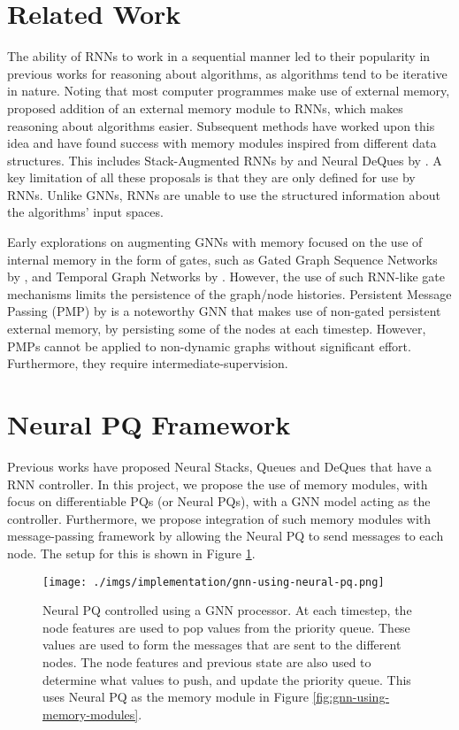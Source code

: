 \documentclass{article}
\theoremstyle{plain}
\theoremstyle{definition}
\theoremstyle{remark}
\begin{document}
\section{Related Work}
The ability of RNNs to work in a sequential manner led to their popularity in previous works for reasoning about algorithms, as algorithms tend to be iterative in nature.
Noting that most computer programmes make use of external memory, \citet{Graves-NTM} proposed addition of an external memory module to RNNs, which makes reasoning about
algorithms easier. Subsequent methods have worked upon this idea and have found success with memory modules inspired from different data structures.
This includes Stack-Augmented RNNs by \citep{Joulin-Stack-RNN} and Neural DeQues by \citet{Grefenstette-neural-queue}. A key limitation of all these proposals is that they
are only defined for use by RNNs. Unlike GNNs, RNNs are unable to use the structured information about the algorithms' input spaces.

Early explorations on augmenting GNNs with memory focused on the use of internal memory in the form of gates, such as Gated Graph Sequence Networks
by \citet{Li-GGSN}, and Temporal Graph Networks by \citet{Rossi-TGN}. However, the use of such RNN-like gate mechanisms limits the persistence of the graph/node histories.
Persistent Message Passing (PMP) by \citet{Strathmann-PMP} is a noteworthy GNN that makes use of non-gated persistent external memory, by persisting some of the nodes at each
timestep. However, PMPs cannot be applied to non-dynamic graphs without significant effort. Furthermore, they require intermediate-supervision.

\section{Neural PQ Framework}
Previous works have proposed Neural Stacks, Queues and DeQues \citep{Grefenstette-neural-queue,Joulin-Stack-RNN} that
have a RNN controller. In this project, we propose the use of memory modules, with focus on differentiable PQs (or Neural PQs),
with a GNN model acting as the controller. Furthermore, we propose integration of such memory modules with message-passing
framework by allowing the Neural PQ to send messages to each node. The setup for this is shown in Figure \ref{fig:gnn-using-neural-pq}.

\begin{figure}[tbh]
    \centering
    \texttt{[image: ./imgs/implementation/gnn-using-neural-pq.png]}
    \caption[Proposed Neural PQ framework]{Neural PQ controlled using a GNN processor. At each timestep, the node features are used to pop values from the priority queue. These values are used
             to form the messages that are sent to the different nodes. The node features and previous state are also used to determine what values to push,
             and update the priority queue. This uses Neural PQ as the memory module in Figure \ref{fig:gnn-using-memory-modules}.}
    \label{fig:gnn-using-neural-pq}
\end{figure}
\end{document}
